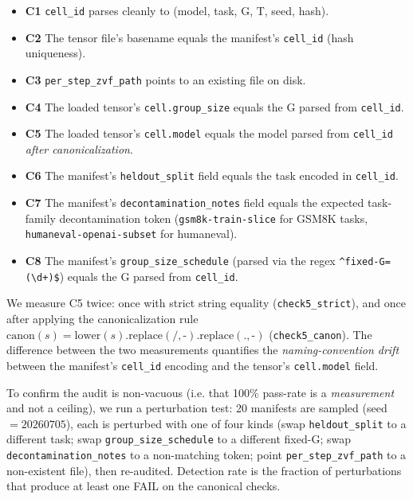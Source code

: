 \begin{itemize}
\item \textbf{C1} \texttt{cell\_id} parses cleanly to (model, task, G, T, seed, hash).
\item \textbf{C2} The tensor file's basename equals the manifest's \texttt{cell\_id} (hash uniqueness).
\item \textbf{C3} \texttt{per\_step\_zvf\_path} points to an existing file on disk.
\item \textbf{C4} The loaded tensor's \texttt{cell.group\_size} equals the G parsed from \texttt{cell\_id}.
\item \textbf{C5} The loaded tensor's \texttt{cell.model} equals the model parsed from \texttt{cell\_id} \emph{after canonicalization}.
\item \textbf{C6} The manifest's \texttt{heldout\_split} field equals the task encoded in \texttt{cell\_id}.
\item \textbf{C7} The manifest's \texttt{decontamination\_notes} field equals the expected task-family decontamination token (\texttt{gsm8k-train-slice} for GSM8K tasks, \texttt{humaneval-openai-subset} for humaneval).
\item \textbf{C8} The manifest's \texttt{group\_size\_schedule} (parsed via the regex \texttt{\^{}fixed-G=(\textbackslash d+)\$}) equals the G parsed from \texttt{cell\_id}.
\end{itemize}

We measure C5 twice: once with strict string equality (\texttt{check5\_strict}),
and once after applying the canonicalization rule
$\mathrm{canon}(s) = \mathrm{lower}(s).\mathrm{replace}(\texttt{/}, \texttt{-}).\mathrm{replace}(\texttt{.}, \texttt{-})$
(\texttt{check5\_canon}). The difference between the two measurements
quantifies the \emph{naming-convention drift} between the manifest's
\texttt{cell\_id} encoding and the tensor's \texttt{cell.model} field.

To confirm the audit is non-vacuous (i.e. that 100\% pass-rate is a
\emph{measurement} and not a ceiling), we run a perturbation test: 20
manifests are sampled (seed $= 20260705$), each is perturbed with one of
four kinds (swap \texttt{heldout\_split} to a different task; swap
\texttt{group\_size\_schedule} to a different fixed-G; swap
\texttt{decontamination\_notes} to a non-matching token; point
\texttt{per\_step\_zvf\_path} to a non-existent file), then re-audited.
Detection rate is the fraction of perturbations that produce at least one
FAIL on the canonical checks.

